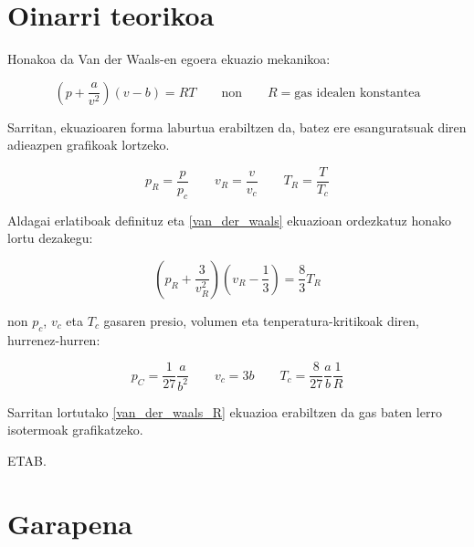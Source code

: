 \documentclass[10pt,a4paper]{article}
\begin{document}
\section{Oinarri teorikoa}
Honakoa da Van der Waals-en egoera ekuazio mekanikoa:

\begin{equation}\label{van_der_waals}
\left( p + \frac{a}{v^2} \right) ( v- b) = RT \qquad \text{non} \qquad R = \text{gas idealen konstantea}
\end{equation}

Sarritan, ekuazioaren forma laburtua erabiltzen da, batez ere esanguratsuak diren adieazpen grafikoak lortzeko.

\begin{equation}
p_R = \frac{p}{p_c} \qquad v_R = \frac{v}{v_c} \qquad T_R = \frac{T}{T_c}
\end{equation}

Aldagai erlatiboak definituz eta \ref{van_der_waals} ekuazioan ordezkatuz honako lortu dezakegu:

\begin{equation}\label{van_der_waals_R}
\left( p_R + \frac{3}{v_R^2} \right) ( v_R - \frac{1}{3}) = \frac{8}{3} T_R 
\end{equation}

non $p_c$, $v_c$ eta $T_c$ gasaren presio, volumen eta tenperatura-kritikoak diren, hurrenez-hurren:

\begin{equation}
p_C = \frac{1}{27} \frac{a}{b^2} \qquad v_c = 3b \qquad T_c = \frac{8}{27}\frac{a}{b}\frac{1}{R}
\end{equation}

Sarritan lortutako \ref{van_der_waals_R} ekuazioa erabiltzen da gas baten lerro isotermoak grafikatzeko. 


ETAB. 
\section{Garapena}
\end{document}
